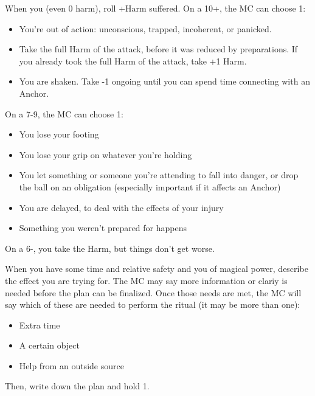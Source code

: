 \begin{multicols}{3}
  \begin{move}
    When you  (even 0 harm), roll +Harm
    suffered. On a 10+, the MC can choose 1:
    \begin{itemize}
      \setlength\itemsep{0em}
    \item You're out of action: unconscious, trapped, incoherent, or
      panicked.
    \item Take the full Harm of the attack, before it was reduced by
      preparations. If you already took the full Harm of the attack, take
      +1 Harm.
    \item You are shaken. Take -1 ongoing until you can spend time
      connecting with an Anchor.
    \end{itemize}
    On a 7-9, the MC can choose 1:
    \begin{itemize}
      \setlength\itemsep{0em}
    \item You lose your footing
    \item You lose your grip on whatever you're holding
    \item You let something or someone you're attending to fall into
      danger, or drop the ball on an obligation (especially important
      if it affects an Anchor)
    \item You are delayed, to deal with the effects of your injury
    \item Something you weren't prepared for happens
    \end{itemize}
    On a 6-, you take the Harm, but things don't get worse.
  \end{move}

  \columnbreak
  
  \begin{move}
    When you have some time and relative safety and you  of magical power, describe the effect you are trying
    for. The MC may say more information or clariy is needed before
    the plan can be finalized. Once those needs are met, the MC will
    say which of these are needed to perform the ritual (it may be
    more than one):
    \begin{itemize}
      \setlength\itemsep{0em}
    \item Extra time
    \item A certain object
    \item Help from an outside source
    \end{itemize}
    Then, write down the plan and hold 1.
  \end{move}


\end{multicols}

